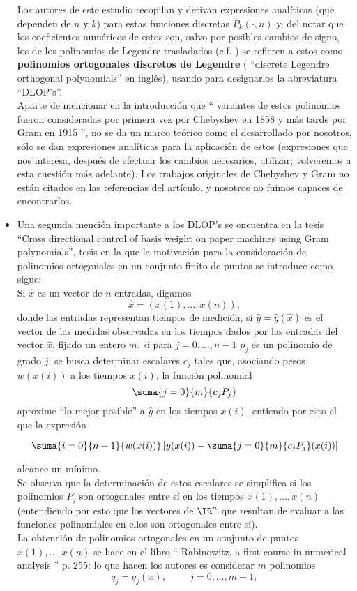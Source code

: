 \begin{itemize}
Los autores de este estudio recopilan y derivan expresiones
analíticas (que dependen de $n$ y $k$) para estas funciones
discretas $P_{k}(\cdot ,n)$ y, del notar que los coeficientes
numéricos de estos son, salvo por posibles cambios de signo,
los de los polinomios de Legendre trasladados 
(c.f. \cite{leg})
se refieren a 
estos como \textbf{polinomios ortogonales
discretos de Legendre} (
``discrete Legendre orthogonal
polynomials'' en inglés), usando para designarlos la abreviatura
``DLOP's''. \\

Aparte de mencionar en la introducción que
`` variantes de estos polinomios fueron consideradas por primera
vez por Chebyshev en 1858 y más tarde por Gram en 1915 '', no se
da un marco teórico como el desarrollado por nosotros, sólo 
se dan expresiones analíticas para la aplicación de estos
(expresiones que nos interesa, después de efectuar los
cambios necesarios, utilizar; volveremos a esta cuestión más
adelante). Los trabajos originales de Chebyshev y Gram
no están citados en las referencias del artículo, y 
nosotros no fuimos capaces de 
encontrarlos. 


\item  Una segunda mención importante a los DLOP's se encuentra en 
la tesis ``Cross directional control of basis weight on paper machines
using Gram polynomials'', tesis en la que la motivación para la consideración de
polinomios ortogonales en un conjunto finito de puntos se
introduce como sigue: \\


Si $\hat{x}$ es un vector de $n$ entradas, digamos
\[
\hat{x}=(x(1), \ldots , x(n)),
\]
donde las entradas representan tiempos de medición,
si $\hat{y}=\hat{y}(\hat{x})$ es el vector de las medidas 
observadas en los tiempos dados por las entradas del vector $\hat{x}$,
fijado un entero $m$, si para $j=0, \ldots , n-1$
$p_{j}$ es un polinomio de grado $j$, se busca determinar escalares
$c_{j}$ tales que, asociando pesos $w(x(i))$ a los tiempos $x(i)$,
la función polinomial
\[
\suma{j=0}{m}{c_{j}P_{j}}
\]
aproxime ``lo mejor posible'' a $\hat{y}$ en los tiempos $x(i)$, 
entiendo por esto el que la expresión

\[
\suma{i=0}{n-1}{w(x(i))}\left[ y(x(i))- 
\suma{j=0}{m}{c_{j}P_{j}}(x(i)) \right]
\]

alcance un mínimo. \\
Se observa que la determinación de estos escalares se
simplifica si los polinomios $P_{j}$ son ortogonales
entre sí en los tiempos $x(1), \ldots , x(n)$ (entendiendo
por esto que los vectores de $\IR^{n}$ que resultan de evaluar
a las funciones polinomiales en ellos son ortogonales entre sí). \\
La obtención de polinomios ortogonales en un
conjunto de puntos $x(1), \ldots , x(n)$ se hace en el 
libro `` Rabinowitz, a first course in numerical analysis ''
p. 255: lo que hacen los autores es
considerar $m$ polinomios
\[
q_{j}=q_{j}(x),\hspace{1cm} j=0, \ldots , m-1,
\]


\end{itemize}
